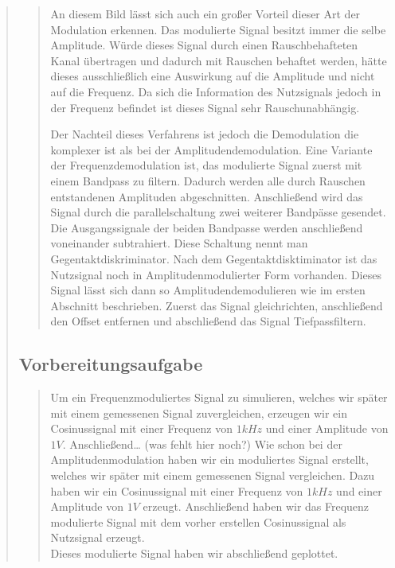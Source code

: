 \begin{quote}
\begin{quote}
        An diesem Bild lässt sich auch ein großer Vorteil dieser Art der Modulation erkennen. Das modulierte Signal
        besitzt immer die selbe Amplitude. Würde dieses Signal durch einen Rauschbehafteten Kanal übertragen und dadurch
        mit Rauschen behaftet werden, hätte dieses ausschließlich eine Auswirkung auf die Amplitude und nicht auf die
        Frequenz. Da sich die Information des Nutzsignals jedoch in der Frequenz befindet ist dieses Signal sehr
        Rauschunabhängig.\vspace{1em}
        
        Der Nachteil dieses Verfahrens ist jedoch die Demodulation die komplexer ist als bei der Amplitudendemodulation.
        Eine Variante der Frequenzdemodulation ist, das modulierte Signal zuerst mit einem Bandpass zu filtern. Dadurch
        werden alle durch Rauschen entstandenen Amplituden abgeschnitten. Anschließend wird das Signal durch die
        parallelschaltung zwei weiterer Bandpässe gesendet. Die Ausgangssignale der beiden Bandpasse werden anschließend
        voneinander subtrahiert. Diese Schaltung nennt man Gegentaktdiskriminator. Nach dem Gegentaktdisktiminator ist
        das Nutzsignal noch in Amplitudenmodulierter Form vorhanden. Dieses Signal lässt sich dann so
        Amplitudendemodulieren wie im ersten Abschnitt beschrieben. Zuerst das Signal gleichrichten, anschließend den
        Offset entfernen und abschließend das Signal Tiefpassfiltern.
    
    \end{quote}
    
    \subsection{Vorbereitungsaufgabe}
    \begin{quote}
        Um ein Frequenzmoduliertes Signal zu simulieren, welches wir später mit einem gemessenen Signal zuvergleichen,
        erzeugen wir ein Cosinussignal mit einer Frequenz von $1kHz$ und einer
        Amplitude von $1V$. Anschließend\ldots
        (was fehlt hier noch?)
        Wie schon bei der Amplitudenmodulation  haben wir ein moduliertes Signal erstellt, welches wir später mit einem
        gemessenen Signal vergleichen. Dazu haben wir ein Cosinussignal mit einer Frequenz von
        $1kHz$ und einer Amplitude von $1V$ erzeugt. Anschließend haben wir das Frequenz modulierte Signal mit dem
        vorher erstellen Cosinussignal als Nutzsignal erzeugt.\\
        Dieses modulierte Signal haben wir abschließend geplottet.
    \end{quote}
    

\end{quote}
